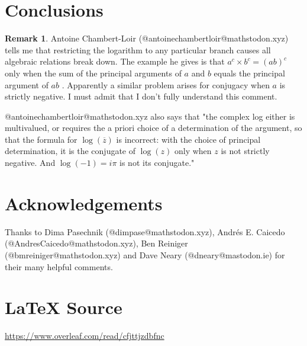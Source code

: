 \documentclass{article}
\theoremstyle{definition}
\newtheorem{remark}{Remark}[section]
\begin{document}
\bigskip
\begin{figure}[H]
\end{figure}
%
%
%
\section{Conclusions}
\label{sec:conclusions}
\begin{remark}
\label{remark:complex_logarithm}
Antoine Chambert-Loir (@antoinechambertloir@mathstodon.xyz) tells
me that restricting the logarithm to any particular branch causes
all algebraic relations break down. The example he gives is that
$a^c \times b^c = (ab)^c$ only when the sum of the principal
arguments of $a$ and $b$ equals the principal argument of $ab$
\cite{principal_argument}. Apparently a similar problem arises
for conjugacy when $a$ is strictly negative. I must admit that
I don't fully understand this comment.


\bigskip
\noindent
@antoinechambertloir@mathstodon.xyz also says that "the complex log either is multivalued, 
or requires the a priori choice of a determination of the argument, so that the formula for 
$\log (\overline{z})$ is incorrect: with the choice of principal determination, it is the conjugate 
of $\log(z)$ only when $z$ is not strictly negative. And $\log(-1) = i\pi$ is not its conjugate."
\end{remark}

%
%
%
\smallskip
\section*{Acknowledgements}
Thanks to Dima Pasechnik (@dimpase@mathstodon.xyz), Andrés
E. Caicedo (@AndresCaicedo@mathstodon.xyz), Ben Reiniger
(@bmreiniger@mathstodon.xyz) and Dave Neary (@dneary@mastodon.ie)
for their many helpful comments.
%
%
\section*{\LaTeX \hspace{0.10 mm} Source}
\url{https://www.overleaf.com/read/cfjttjzdbfnc}
%
%
%


%
%
\end{document}

